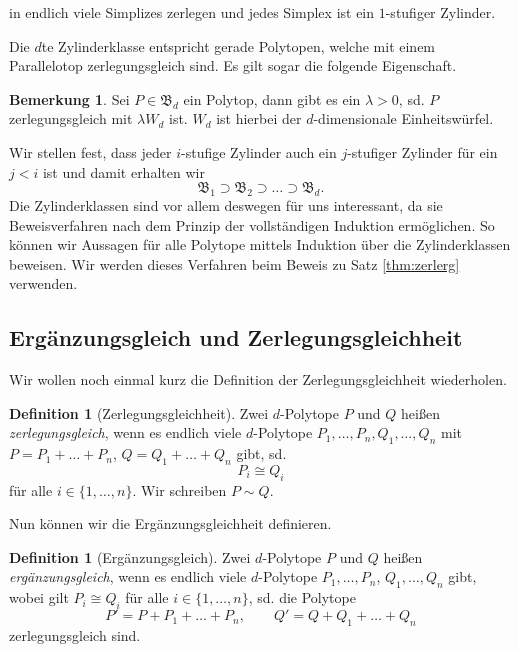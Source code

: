\documentclass[11pt,titlepage]{article}
\theoremstyle{definition}
\newtheorem{definition}[theorem]{Definition}
\newtheorem{remark}[theorem]{Bemerkung}
\theoremstyle{remark}
\begin{document}
	
	in endlich viele Simplizes zerlegen und jedes Simplex ist ein $1$-stufiger 
	Zylinder.
	
	
	Die $d$te Zylinderklasse entspricht gerade Polytopen, welche mit einem 
	Parallelotop zerlegungsgleich sind. Es gilt sogar die folgende Eigenschaft.
	
	\begin{remark} \label{bem:dteZylinderklasse}
		Sei $P\in\mathfrak{B}_d$ ein Polytop, dann gibt es ein $\lambda>0$, sd. 
		$P$ zerlegungsgleich mit $\lambda W_d$ ist. $W_d$ ist hierbei 
		der $d$-dimensionale Einheitswürfel.
		
		
	\end{remark}
	
	Wir stellen fest, dass jeder $i$-stufige Zylinder auch ein $j$-stufiger 
	Zylinder für ein $j<i$ ist und damit erhalten wir
	\[\mathfrak{B}_1\supset \mathfrak{B}_2\supset \ldots\supset\mathfrak{B}_d.\]
	Die Zylinderklassen sind vor allem deswegen für uns interessant, da sie 
	Beweisverfahren nach dem Prinzip der vollständigen Induktion ermöglichen. 
	So können wir Aussagen für alle Polytope mittels Induktion über die 
	Zylinderklassen beweisen. Wir werden dieses Verfahren beim Beweis zu Satz 
	\ref{thm:zerlerg} verwenden.

	\subsection{Ergänzungsgleich und Zerlegungsgleichheit}
	
	Wir wollen noch einmal kurz die Definition der Zerlegungsgleichheit wiederholen.
	
	\begin{definition}[Zerlegungsgleichheit]
		Zwei $d$-Polytope $P$ und $Q$ heißen \textsl{zerlegungsgleich}, wenn es endlich viele $d$-Polytope 
		$P_1,\ldots,P_n,Q_1,\ldots,Q_n$ mit $P=P_1 +\ldots +P_n$,  $Q=Q_1 +\ldots+Q_n$ 
		gibt, sd. 
		\[P_i\cong Q_i\]
		für alle $i\in\{1,\ldots,n\}$. Wir schreiben $P\sim Q$.
	\end{definition}
	
	Nun können wir die Ergänzungsgleichheit definieren.
	
	\begin{definition}[Ergänzungsgleich]
		Zwei $d$-Polytope $P$ und $Q$ heißen \textsl{ergänzungsgleich}, wenn es endlich viele $d$-Polytope 
		$P_1,\ldots,P_n$, $Q_1,\ldots,Q_n$ gibt, wobei gilt $P_i\cong Q_i$ für alle $i\in\{1,\ldots,n\}$, sd. die Polytope
		\[P'=P+P_1+\ldots+P_n,\qquad Q'=Q+Q_1+\ldots+Q_n\]
		zerlegungsgleich sind.
	\end{definition}
	
\end{document}
